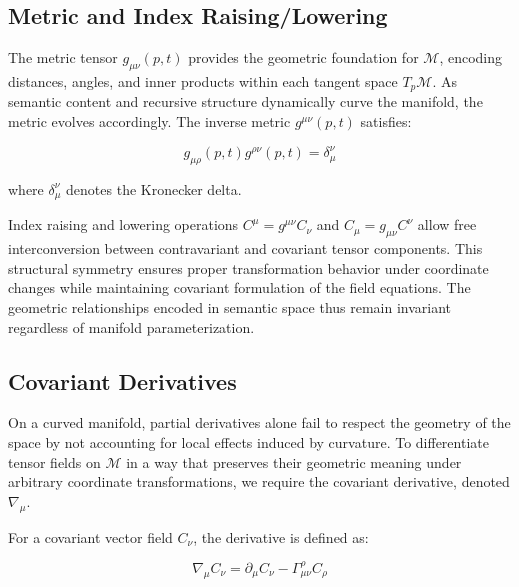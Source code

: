 \subsection{Metric and Index Raising/Lowering}
\label{2.4.2:metric_and_index_raising_lowering}

The metric tensor \(g_{\mu\nu}(p,t)\) provides the geometric foundation for \(\mathcal{M}\), encoding distances, angles, and inner products within each tangent space \(T_p\mathcal{M}\). As semantic content and recursive structure dynamically curve the manifold, the metric evolves accordingly. The inverse metric \(g^{\mu\nu}(p,t)\) satisfies:

\begin{equation}
g_{\mu\rho}(p,t) g^{\rho\nu}(p,t) = \delta_\mu^\nu
\end{equation}

where \(\delta_\mu^\nu\) denotes the Kronecker delta.

Index raising and lowering operations \(C^\mu = g^{\mu\nu} C_\nu\) and \(C_\mu = g_{\mu\nu} C^\nu\) allow free interconversion between contravariant and covariant tensor components. This structural symmetry ensures proper transformation behavior under coordinate changes while maintaining covariant formulation of the field equations. The geometric relationships encoded in semantic space thus remain invariant regardless of manifold parameterization.


\subsection{Covariant Derivatives}
\label{2.4.3:covariant_derivatives}

On a curved manifold, partial derivatives alone fail to respect the geometry of the space by not accounting for local effects induced by curvature. To differentiate tensor fields on \(\mathcal{M}\) in a way that preserves their geometric meaning under arbitrary coordinate transformations, we require the covariant derivative, denoted \(\nabla_\mu\).

For a covariant vector field \(C_\nu\), the derivative is defined as:

\begin{equation}
\nabla_\mu C_\nu = \partial_\mu C_\nu - \Gamma^\rho_{\mu\nu} C_\rho
\end{equation}

